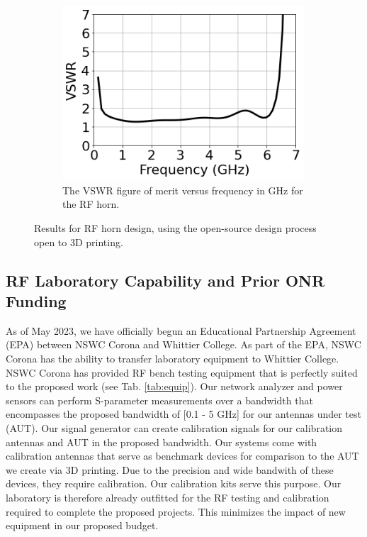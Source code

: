 \documentclass[../../main.tex]{subfiles}
\begin{document}
\begin{figure}
\begin{subfigure}{0.65\textwidth}
\end{subfigure}
\hfill
\begin{subfigure}{0.3\textwidth}
    \includegraphics[width=0.99\textwidth]{figures/vswr.png}
	\caption{The VSWR figure of merit versus frequency in GHz for the RF horn.}
\end{subfigure}
\caption{Results for RF horn design, using the open-source design process open to 3D printing.}
\label{fig:3d_cad}
\end{figure}

\subsection{RF Laboratory Capability and Prior ONR Funding}

As of May 2023, we have officially begun an Educational Partnership Agreement (EPA) between NSWC Corona and Whittier College.  As part of the EPA, NSWC Corona has the ability to transfer laboratory equipment to Whittier College.  NSWC Corona has provided RF bench testing equipment that is perfectly suited to the proposed work (see Tab. \ref{tab:equip}).  Our network analyzer and power sensors can perform S-parameter measurements over a bandwidth that encompasses the proposed bandwidth of [0.1 - 5 GHz] for our antennas under test (AUT).  Our signal generator can create calibration signals for our calibration antennas and AUT in the proposed bandwidth.  Our systems come with calibration antennas that serve as benchmark devices for comparison to the AUT we create via 3D printing.  Due to the precision and wide bandwith of these devices, they require calibration.  Our calibration kits serve this purpose.  Our laboratory is therefore already outfitted for the RF testing and calibration required to complete the proposed projects.  This minimizes the impact of new equipment in our proposed budget. \\ \vspace{2.5mm}
\end{document}
